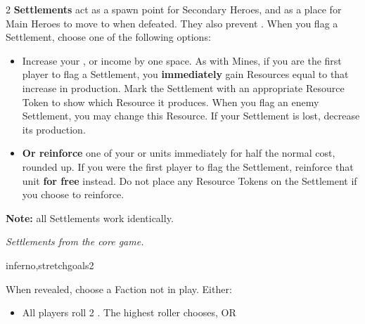 \begin{multicols}{2}
\textbf{Settlements} act as a spawn point for Secondary Heroes, and as a place for Main Heroes to move to when defeated.
They also prevent .
When you flag a Settlement, choose one of the following options:
\begin{itemize}
  \item Increase your ,  or  income by one space.
    As with Mines, if you are the first player to flag a Settlement, you \textbf{immediately} gain Resources equal to that increase in production.
      Mark the Settlement with an appropriate Resource Token to show which Resource it produces.
      When you flag an enemy Settlement, you may change this Resource.
      If your Settlement is lost, decrease its production.
  \item \textbf{Or reinforce} one of your  or  units immediately for half the normal cost, rounded up.
    If you were the first player to flag the Settlement, reinforce that unit \textbf{for free} instead.
    Do not place any Resource Tokens on the Settlement if you choose to reinforce.
\end{itemize}
\textbf{Note:} all Settlements work identically.

\begin{center}
  \vspace*{-1em}
  \textit{Settlements from the core game.}
\end{center}

\vspace*{\fill}
\columnbreak

\begin{expansion}[before=\vspace*{-11mm}]{inferno,stretchgoals2}

  \medskip
  When revealed, choose a Faction not in play. Either:
  \begin{itemize}
    \item All players roll 2 .
      The highest roller chooses, OR
  \end{itemize}


\end{expansion}
\end{multicols}
